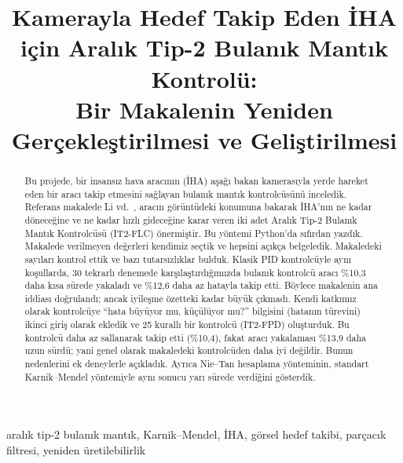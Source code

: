 \documentclass[conference,a4paper]{IEEEtran}
\begin{document}
\title{Kamerayla Hedef Takip Eden İHA için Aralık Tip-2 Bulanık Mantık Kontrolü:\\ Bir Makalenin Yeniden Gerçekleştirilmesi ve Geliştirilmesi}

\author{
}

\maketitle

\begin{abstract}
Bu projede, bir insansız hava aracının (İHA) aşağı bakan kamerasıyla yerde hareket eden bir aracı takip etmesini sağlayan bulanık mantık kontrolcüsünü inceledik. Referans makalede Li vd.~\cite{li2024}, aracın görüntüdeki konumuna bakarak İHA'nın ne kadar döneceğine ve ne kadar hızlı gideceğine karar veren iki adet Aralık Tip-2 Bulanık Mantık Kontrolcüsü (IT2-FLC) önermiştir. Bu yöntemi Python'da sıfırdan yazdık. Makalede verilmeyen değerleri kendimiz seçtik ve hepsini açıkça belgeledik. Makaledeki sayıları kontrol ettik ve bazı tutarsızlıklar bulduk. Klasik PID kontrolcüyle aynı koşullarda, 30 tekrarlı denemede karşılaştırdığımızda bulanık kontrolcü aracı \%10,3 daha kısa sürede yakaladı ve \%12,6 daha az hatayla takip etti. Böylece makalenin ana iddiası doğrulandı; ancak iyileşme özetteki kadar büyük çıkmadı. Kendi katkımız olarak kontrolcüye ``hata büyüyor mu, küçülüyor mu?'' bilgisini (hatanın türevini) ikinci giriş olarak ekledik ve 25 kurallı bir kontrolcü (IT2-FPD) oluşturduk. Bu kontrolcü daha az sallanarak takip etti (\%10,4), fakat aracı yakalaması \%13,9 daha uzun sürdü; yani genel olarak makaledeki kontrolcüden daha iyi değildir. Bunun nedenlerini ek deneylerle açıkladık. Ayrıca Nie--Tan hesaplama yönteminin, standart Karnik--Mendel yöntemiyle aynı sonucu yarı sürede verdiğini gösterdik.
\end{abstract}

\begin{IEEEkeywords}
aralık tip-2 bulanık mantık, Karnik--Mendel, İHA, görsel hedef takibi, parçacık filtresi, yeniden üretilebilirlik
\end{IEEEkeywords}

\end{document}
